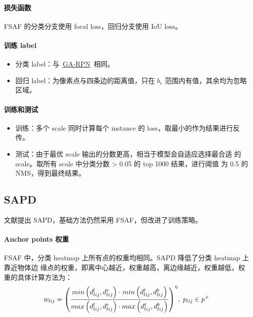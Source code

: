\paragraph{损失函数}
FSAF 的分类分支使用 focal loss，回归分支使用 IoU loss。

\paragraph{训练 label}
\begin{itemize}
\item 分类 label：与~\hyperref[subsubsec:GA-RPN]{GA-RPN}~相同。
  \item 回归 label：为像素点与四条边的距离值，只在 $b_e$ 范围内有值，其余均为忽略区域。
\end{itemize}

\paragraph{训练和测试}
\begin{itemize}
  \item 训练：多个 scale 同时计算每个 instance 的 loss，取最小的作为结果进行反传。
  \item 测试：由于最优 scale 输出的分数更高，相当于模型会自适应选择最合适
    的 scale。取所有 scale 中分类分数 > 0.05 的 top 1000 结果，进行阈值
    为 0.5 的 NMS，得到最终结果。
\end{itemize}

\subsection{SAPD}
文献提出 SAPD，基础方法仍然采用 FSAF，但改进了训练策略。

\paragraph{Anchor points 权重}
FSAF 中，分类 heatmap 上所有点的权重均相同。SAPD 降低了分类 heatmap 上靠近物体边
缘点的权重，即离中心越近，权重越高，离边缘越近，权重越低，权重的具体计算方法为：
\begin{equation}
  w_{lij} = {\left( \frac{\\min \left( d_{lij}^l, d_{lij}^r \right) \cdot \\min \left( d_{lij}^t, d_{lij}^b \right)}{\\max \left( d_{lij}^l, d_{lij}^r \right) \cdot \\max \left( d_{lij}^t, d_{lij}^b \right)} \right)}^{\eta}, \; p_{lij} \in p^+
\end{equation}

